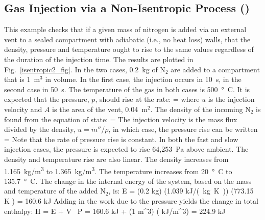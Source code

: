\documentclass[11pt]{book}
\begin{document}
\subsection{Gas Injection via a Non-Isentropic Process (\texorpdfstring{}{isentropic2})}
\label{isentropic2}

This example checks that if a given mass of nitrogen is added via an external vent to a sealed compartment with adiabatic (i.e., no heat loss) walls, that the density, pressure and temperature ought to rise to the same values regardless of the duration of the injection time.  The results are plotted in Fig.~\ref{isentropic2_fig}. In the two cases, 0.2~kg of N$_2$ are added to a compartment that is 1~m$^3$ in volume. In the first case, the injection occurs in 10~s, in the second case in 50~s. The temperature of the gas in both cases is 500~\si{\degree C}. It is expected that the pressure, $p$, should rise at the rate:
\be
    = 
\ee
where $u$ is the injection velocity and $A$ is the area of the vent, 0.04~m$^2$. The density of the incoming N$_2$ is found from the equation of state:
\be
   \rho = 
\ee
The injection velocity is the mass flux divided by the density, $u=\dot{m}''/\rho$, in which case, the pressure rise can be written
\be
    = 
\ee
Note that the rate of pressure rise is constant. In both the fast and slow injection cases, the pressure is expected to rise 64,253~Pa above ambient. The density and temperature rise are also linear. The density increases from 1.165~\si{kg/m^3} to 1.365~\si{kg/m^3}. The temperature increases from 20~\si{\degree C} to 135.7~\si{\degree C}. The change in the internal energy of the system, based on the mass and temperature of the added N$_2$, is:
\be
   \Delta E = (0.2 \; \hbox{kg}) \times (1.039 \; \hbox{\si{kJ/(kg.K)}}) \times (773.15 \; \hbox{K} ) = 160.6 \; \hbox{kJ}
\ee
Adding in the work due to the pressure yields the change in total enthalpy:
\be
   \Delta H = \Delta E + V \, \Delta P = 160.6 \; \hbox{kJ} + (1 \; \hbox{m}^3) \times (  \; \hbox{kJ/m}^3) = 224.9 \; \hbox{kJ}
\ee
\end{document}
